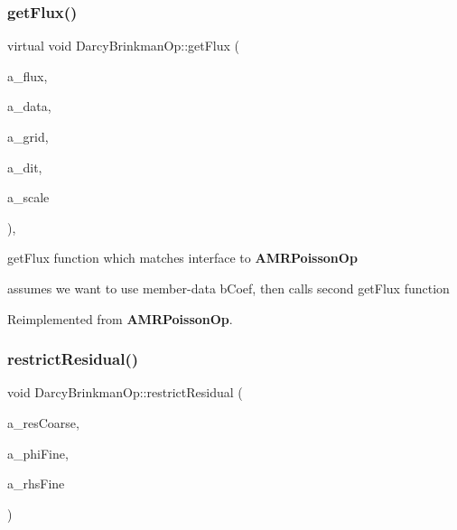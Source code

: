 \subsubsection{\texorpdfstring{get\+Flux()}{getFlux()}}
{\footnotesize\ttfamily virtual void Darcy\+Brinkman\+Op\+::get\+Flux (\begin{DoxyParamCaption}\item[{\textbf{ Flux\+Box} \&}]{a\+\_\+flux,  }\item[{const \textbf{ Level\+Data}$<$ \textbf{ F\+Array\+Box} $>$ \&}]{a\+\_\+data,  }\item[{const \textbf{ Box} \&}]{a\+\_\+grid,  }\item[{const \textbf{ Data\+Index} \&}]{a\+\_\+dit,  }\item[{\textbf{ Real}}]{a\+\_\+scale }\end{DoxyParamCaption})\hspace{0.3cm}{\ttfamily [inline]}, {\ttfamily [virtual]}}



get\+Flux function which matches interface to \textbf{ A\+M\+R\+Poisson\+Op} 

assumes we want to use member-\/data b\+Coef, then calls second get\+Flux function 

Reimplemented from \textbf{ A\+M\+R\+Poisson\+Op}.

\mbox{\label{class_darcy_brinkman_op_a22da926f24eef3899c539896dc6cc314}} 
\subsubsection{\texorpdfstring{restrict\+Residual()}{restrictResidual()}}
{\footnotesize\ttfamily void Darcy\+Brinkman\+Op\+::restrict\+Residual (\begin{DoxyParamCaption}\item[{\textbf{ Level\+Data}$<$ \textbf{ F\+Array\+Box} $>$ \&}]{a\+\_\+res\+Coarse,  }\item[{\textbf{ Level\+Data}$<$ \textbf{ F\+Array\+Box} $>$ \&}]{a\+\_\+phi\+Fine,  }\item[{const \textbf{ Level\+Data}$<$ \textbf{ F\+Array\+Box} $>$ \&}]{a\+\_\+rhs\+Fine }\end{DoxyParamCaption})\hspace{0.3cm}{\ttfamily [virtual]}}

